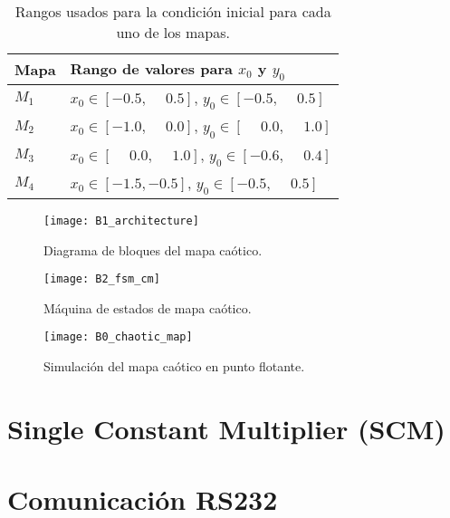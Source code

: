         \begin{table}[htbp]
            \centering
            \caption{Rangos usados para la condición inicial para cada uno de los mapas.}
            \begin{tabular}{|l|l|}
                \hline
                \rowcolor{lightgray} Mapa  & Rango de valores para $x_{0}$ y $y_{0}$ \\
                \hline
                $M_{1}$  & $x_{0} \in [-0.5, \phantom{-} 0.5]$, $y_{0} \in [-0.5, \phantom{-}0.5]$ \\
                \hline
                $M_{2}$  & $x_{0} \in [-1.0, \phantom{-} 0.0]$, $y_{0} \in [\phantom{-}0.0, \phantom{-}1.0]$ \\
                \hline
                $M_{3}$  & $x_{0} \in [\phantom{-}0.0, \phantom{-} 1.0]$, $y_{0} \in [-0.6, \phantom{-}0.4]$ \\
                \hline
                $M_{4}$  & $x_{0} \in [-1.5, -0.5]$, $y_{0} \in [-0.5, \phantom{-}0.5]$ \\
                \hline
            \end{tabular}
        \end{table}

        \begin{figure}[hbtp]
            \caption{Diagrama de bloques del mapa caótico.}
            \centering
            \texttt{[image: B1\_architecture]}
            \label{fig:B1_architecture}
        \end{figure}

        \begin{figure}[hbtp]
            \caption{Máquina de estados de mapa caótico.}
            \centering
            \texttt{[image: B2\_fsm\_cm]}
            \label{fig:B2_fsm_cm}
        \end{figure}

        \begin{figure}[hbtp]
            \caption{Simulación del mapa caótico en punto flotante.}
            \centering
            \texttt{[image: B0\_chaotic\_map]}
            \label{fig:B0_chaotic_map}
        \end{figure}

    \section{Single Constant Multiplier (SCM)}


    \section{Comunicación RS232}

